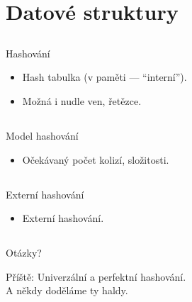 \documentclass{beamer}
\begin{document}
\section{Datové struktury}

\subsection{}
\begin{frame}{Hashování}
\begin{itemize}
\item Hash tabulka (v paměti --- ``interní'').
\item Možná i nudle ven, řetězce.
\end{itemize}
\end{frame}

\subsection{}
\begin{frame}{Model hashování}
\begin{itemize}
\item Očekávaný počet kolizí, složitosti.
\end{itemize}
\end{frame}

\subsection{}
\begin{frame}{Externí hashování}
\begin{itemize}
\item Externí hashování.
\end{itemize}
\end{frame}

\subsection{}

\subsection{}
\begin{frame}{Otázky?}
\begin{center}
Příště: Univerzální a perfektní hashování. \\ A někdy doděláme ty haldy.
\end{center}
\end{frame}
\end{document}
